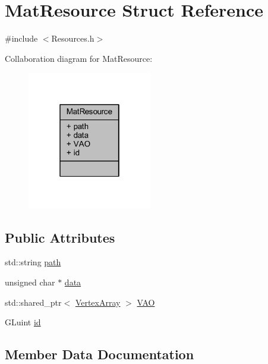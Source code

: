 \hypertarget{struct_mat_resource}{}\section{Mat\+Resource Struct Reference}
\label{struct_mat_resource}


{\ttfamily \#include $<$Resources.\+h$>$}



Collaboration diagram for Mat\+Resource\+:
\nopagebreak
\begin{figure}[H]
\begin{center}
\leavevmode
\includegraphics[width=154pt]{struct_mat_resource__coll__graph}
\end{center}
\end{figure}
\subsection*{Public Attributes}
\begin{DoxyCompactItemize}
\item 
std\+::string \mbox{\hyperlink{struct_mat_resource_ad4586d33efdbb0a46137f01eb22043f8}{path}}
\item 
unsigned char $\ast$ \mbox{\hyperlink{struct_mat_resource_ae258c8d165fa65017eb07be4787bb0ff}{data}}
\item 
std\+::shared\+\_\+ptr$<$ \mbox{\hyperlink{class_vertex_array}{Vertex\+Array}} $>$ \mbox{\hyperlink{struct_mat_resource_ab208f0b2bcb3478c64ee208ebceb1f18}{V\+AO}}
\item 
G\+Luint \mbox{\hyperlink{struct_mat_resource_ab05a8aa12860a2f550a9c4ff0fb1ce4e}{id}}
\end{DoxyCompactItemize}


\subsection{Member Data Documentation}
\mbox{\label{struct_mat_resource_ae258c8d165fa65017eb07be4787bb0ff}} 
